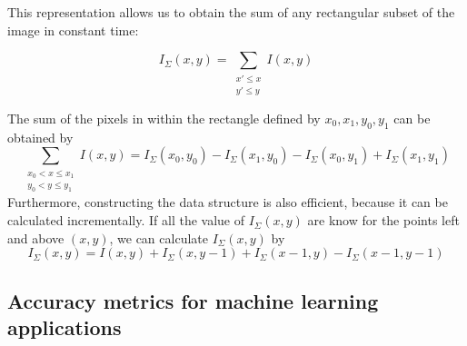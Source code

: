 

This representation allows us to obtain the sum of any rectangular subset
of the image in constant time:

\begin{equation}
I_\Sigma (x,y) =   \sum_{\substack{x' \leq x \\ y' \leq y}}I(x,y)
\end{equation}

The sum of the pixels in within the rectangle defined by $x_0,x_1,y_0,y_1$ can be obtained by
\begin{equation}
\sum_{\substack{ x_0 < x \leq x_1\\ y_0 < y \leq y_1} }I(x,y) = I_\Sigma(x_0,y_0) - I_\Sigma(x_1,y_0)-I_\Sigma(x_0,y_1)+I_\Sigma(x_1,y_1)
\end{equation}
Furthermore, constructing the data structure is also efficient, because it can be calculated incrementally. If
all the value of $I_\Sigma(x,y)$ are know for the points left and above $(x,y)$, we can
calculate $I_\Sigma(x,y)$ by
\begin{equation}
I_\Sigma (x,y) = I(x,y) + I_\Sigma (x,y-1)+I_\Sigma (x-1,y)-I_\Sigma (x-1,y-1)
\end{equation}


\subsection{Accuracy metrics for machine learning applications}

